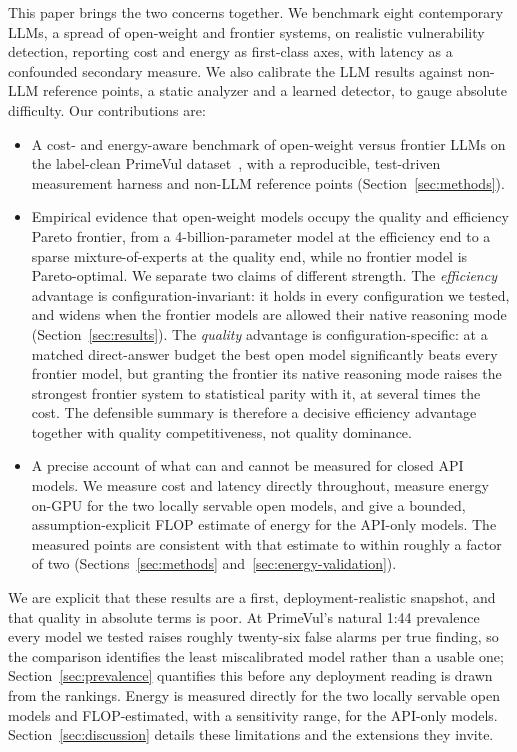 \documentclass[computers,article,submit,moreauthors]{Definitions/mdpi}
\begin{document}
This paper brings the two concerns together. We benchmark eight contemporary LLMs, a spread of open-weight and frontier systems, on realistic vulnerability detection, reporting cost and energy as first-class axes, with latency as a confounded secondary measure. We also calibrate the LLM results against non-LLM reference points, a static analyzer and a learned detector, to gauge absolute difficulty. Our contributions are:
\begin{itemize}
\item A cost- and energy-aware benchmark of open-weight versus frontier LLMs on the label-clean PrimeVul dataset~\citep{primevul}, with a reproducible, test-driven measurement harness and non-LLM reference points (Section~\ref{sec:methods}).
\item Empirical evidence that open-weight models occupy the quality and efficiency Pareto frontier, from a 4-billion-parameter model at the efficiency end to a sparse mixture-of-experts at the quality end, while no frontier model is Pareto-optimal. We separate two claims of different strength. The \emph{efficiency} advantage is configuration-invariant: it holds in every configuration we tested, and widens when the frontier models are allowed their native reasoning mode (Section~\ref{sec:results}). The \emph{quality} advantage is configuration-specific: at a matched direct-answer budget the best open model significantly beats every frontier model, but granting the frontier its native reasoning mode raises the strongest frontier system to statistical parity with it, at several times the cost. The defensible summary is therefore a decisive efficiency advantage together with quality competitiveness, not quality dominance.
\item A precise account of what can and cannot be measured for closed API models. We measure cost and latency directly throughout, measure energy on-GPU for the two locally servable open models, and give a bounded, assumption-explicit FLOP estimate of energy for the API-only models. The measured points are consistent with that estimate to within roughly a factor of two (Sections~\ref{sec:methods} and~\ref{sec:energy-validation}).
\end{itemize}

We are explicit that these results are a first, deployment-realistic snapshot, and that quality in absolute terms is poor. At PrimeVul's natural 1:44 prevalence every model we tested raises roughly twenty-six false alarms per true finding, so the comparison identifies the least miscalibrated model rather than a usable one; Section~\ref{sec:prevalence} quantifies this before any deployment reading is drawn from the rankings. Energy is measured directly for the two locally servable open models and FLOP-estimated, with a sensitivity range, for the API-only models. Section~\ref{sec:discussion} details these limitations and the extensions they invite.
\end{document}
